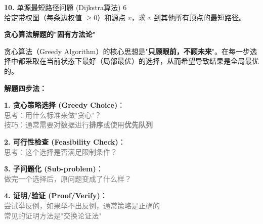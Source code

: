\vspace{8pt}
\textbf{10.} 单源最短路径问题 (Dijkstra算法) \hfill 6\\
给定带权图（每条边权值 $\ge 0$）和源点 $v$，求 $v$ 到其他所有顶点的最短路径。

\columnbreak

\vspace{1cm}
{\large\textbf{贪心算法解题的"固有方法论"}}
\vspace{0.2cm}

贪心算法（Greedy Algorithm）的核心思想是"\textbf{只顾眼前，不顾未来}"。在每一步选择中都采取在当前状态下最好（局部最优）的选择，从而希望导致结果是全局最优的。

\textbf{解题四步法：}

\textbf{1. 贪心策略选择 (Greedy Choice)}：\\
\textcolor{gray}{思考：用什么标准来做"贪心"？}\\
\textcolor{gray}{技巧：通常需要对数据进行\textbf{排序}或使用\textbf{优先队列}}

\textbf{2. 可行性检查 (Feasibility Check)}：\\
\textcolor{gray}{思考：这个选择是否满足限制条件？}

\textbf{3. 子问题化 (Sub-problem)}：\\
\textcolor{gray}{做完一个选择后，原问题变成了什么样？}

\textbf{4. 证明/验证 (Proof/Verify)}：\\
\textcolor{gray}{尝试举反例，如果举不出反例，通常策略是正确的}\\
\textcolor{gray}{常见的证明方法是"交换论证法"}
